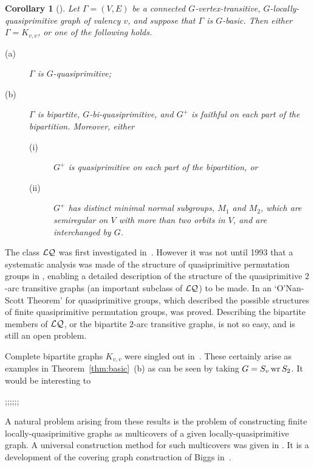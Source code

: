 \documentclass[12pt, a4paper]{article}
\newtheorem{corollary}[theorem]{Corollary}
\def\FB{{\cal LQ}}
\def\Ga{\Gamma}
\def\wr{{\rm\,wr\,}}
\begin{document}
 
 \begin{corollary}[\cite{lpvz}]\label{cor:basic}
 Let $\Ga=(V,E)$ be a connected $G$-vertex-transitive, 
$G$-locally-quasi\-primit\-ive graph of valency $v$, and suppose 
that $\Ga$ is $G$-basic.
 Then either $\Ga=K_{v,v}$, or one of the following holds.
 \begin{description} 
 \item[(a)]$\Ga$ is $G$-quasiprimitive; 
 \item[(b)]$\Ga$ is bipartite, $G$-bi-quasiprimitive, and $G^+$ is faithful 
 on each part of the bipartition. Moreover, either
        \begin{description}
        \item[(i)] $G^+$ is quasiprimitive on each part of the bipartition, or 
        \item[(ii)] $G^+$ has distinct minimal normal subgroups, 
 $M_1$ and $M_2$, which are semiregular on $V$ with more than two orbits in $V$, 
 and are interchanged by $G$.
\end{description}
 \end{description}
 \end{corollary}



The class $\FB$ was first investigated in~\cite{cep:p2}. 
However it was not until 1993 that a systematic analysis was made of
the structure of quasiprimitive permutation groups in \cite{cep}, 
enabling a detailed description of the structure of the quasiprimitive 
$2$-arc transitive graphs (an important subclass of $\FB$)
to be made. In \cite{cep} an `O'Nan-Scott Theorem' for quasiprimitive groups, 
 which described the possible 
 structures of finite quasiprimitive permutation groups, was proved.
  Describing the bipartite members of $\FB$, or the bipartite
 $2$-arc transitive graphs, is not so easy, and is still an open problem.
 
  Complete bipartite graphs
 $K_{v,v}$ were singled out in~\cite[Lemma 1.1]{cep:p2}. These certainly
 arise as examples  in Theorem~\ref{thm:basic}~(b) as can be seen by taking
 $G=S_v\wr S_2$. It would be interesting to 
 
 
 ;;;;;;
 
 A natural problem arising from these results is the
problem of constructing finite locally-quasiprimitive graphs as multicovers
of a given locally-quasiprimitive graph. A universal construction method
for such multicovers was given in \cite[Section 3]{lpvz}. It is a development
of the covering graph construction of Biggs in~\cite{biggs}. 
\end{document}
